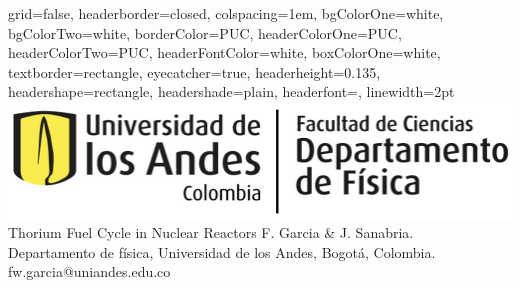 \documentclass[a0paper,portrait]{baposter}
\begin{document}

\begin{poster}
{
grid=false,
headerborder=closed, %
colspacing=1em, %
bgColorOne=white, %
bgColorTwo=white, %
borderColor=PUC, %
headerColorOne=PUC, %
headerColorTwo=PUC, %
headerFontColor=white, %
boxColorOne=white, %
textborder=rectangle, %
eyecatcher=true, %
headerheight=0.135\textheight, %
headershape=rectangle, %
headershade=plain,
headerfont=\Large\textsf, %
linewidth=2pt %
}
%
%
{ %
\includegraphics[scale=0.2]{figures/LogoAndes.jpeg}
}
{ %
\textsf{\Huge Thorium Fuel Cycle in Nuclear Reactors}
}
{%
\sf\huge\vspace{0.3em}
F. Garcia  \& J. Sanabria.\\
\vspace{0.1em}
\small{
Departamento de física, Universidad de los Andes, Bogotá, Colombia. \\
\vspace{0.1em}
fw.garcia@uniandes.edu.co}
}



\end{poster}
\end{document}
